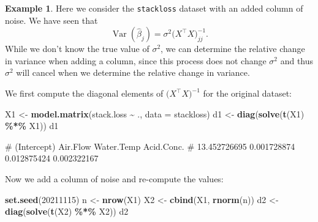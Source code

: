 \documentclass[
  a4paper,
]{article}
\newenvironment{Shaded}{\begin{snugshade}}{\end{snugshade}}
\newcommand{\AttributeTok}[1]{\textcolor[rgb]{0.13,0.29,0.53}{#1}}
\newcommand{\DecValTok}[1]{\textcolor[rgb]{0.00,0.00,0.81}{#1}}
\newcommand{\FunctionTok}[1]{\textcolor[rgb]{0.13,0.29,0.53}{\textbf{#1}}}
\newcommand{\NormalTok}[1]{#1}
\newcommand{\OtherTok}[1]{\textcolor[rgb]{0.56,0.35,0.01}{#1}}
\newcommand{\SpecialCharTok}[1]{\textcolor[rgb]{0.81,0.36,0.00}{\textbf{#1}}}
\theoremstyle{definition}
\theoremstyle{definition}
\newtheorem{example}{Example}[section]
\theoremstyle{definition}
\theoremstyle{definition}
\theoremstyle{remark}
\begin{document}
\begin{example}
Here we consider the \texttt{stackloss} dataset with an added column of
noise. We have seen that
\begin{equation*}
  \mathop{\mathrm{Var}}( \hat\beta_j )
  = \sigma^2 \bigl( X^\top X \bigr)^{-1}_{jj}.
\end{equation*}
While we don't know the true value of \(\sigma^2\), we can determine
the relative change in variance when adding a column, since this process
does not change \(\sigma^2\) and thus \(\sigma^2\) will cancel when we
determine the relative change in variance.

We first compute the diagonal elements of \(\bigl( X^\top X \bigr)^{-1}\)
for the original dataset:

\begin{Shaded}
\begin{Highlighting}[]
\NormalTok{X1 }\OtherTok{\textless{}{-}} \FunctionTok{model.matrix}\NormalTok{(stack.loss }\SpecialCharTok{\textasciitilde{}}\NormalTok{ ., }\AttributeTok{data =}\NormalTok{ stackloss)}
\NormalTok{d1 }\OtherTok{\textless{}{-}} \FunctionTok{diag}\NormalTok{(}\FunctionTok{solve}\NormalTok{(}\FunctionTok{t}\NormalTok{(X1) }\SpecialCharTok{\%*\%}\NormalTok{ X1))}
\NormalTok{d1}
\end{Highlighting}
\end{Shaded}

\begin{Shaded}
\begin{Highlighting}[]
\NormalTok{\#  (Intercept)     Air.Flow   Water.Temp   Acid.Conc. }
\NormalTok{\# 13.452726695  0.001728874  0.012875424  0.002322167}
\end{Highlighting}
\end{Shaded}

Now we add a column of noise and re-compute the values:

\begin{Shaded}
\begin{Highlighting}[]
\FunctionTok{set.seed}\NormalTok{(}\DecValTok{20211115}\NormalTok{)}
\NormalTok{n }\OtherTok{\textless{}{-}} \FunctionTok{nrow}\NormalTok{(X1)}
\NormalTok{X2 }\OtherTok{\textless{}{-}} \FunctionTok{cbind}\NormalTok{(X1, }\FunctionTok{rnorm}\NormalTok{(n))}
\NormalTok{d2 }\OtherTok{\textless{}{-}} \FunctionTok{diag}\NormalTok{(}\FunctionTok{solve}\NormalTok{(}\FunctionTok{t}\NormalTok{(X2) }\SpecialCharTok{\%*\%}\NormalTok{ X2))}
\NormalTok{d2}
\end{Highlighting}
\end{Shaded}


\end{example}
\end{document}
